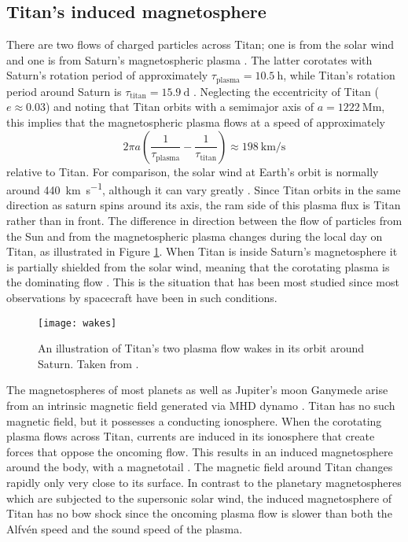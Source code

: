 \documentclass[12pt, parskip=full*, abstract]{scrartcl}
\begin{document}
\subsection{Titan's induced magnetosphere}\label{s:induced-magnetosphere}
There are two flows of charged particles across Titan; one is from the solar wind and one is from Saturn's magnetospheric plasma \parencite{ionosphere-magnetosphere-interaction-coates}. The latter corotates with Saturn's rotation period of approximately $\tau_\text{plasma}=\SI{10.5}{\hour}$, while Titan's rotation period around Saturn is $\tau_\text{titan}=\SI{15.9}{\day}$ \parencite{fundamental-planetary-science}. Neglecting the eccentricity of Titan ($e\approx0.03$) and noting that Titan orbits with a semimajor axis of $a=\SI{1222}{\mega\metre}$, this implies that the magnetospheric plasma flows at a speed of approximately
\begin{equation}
	2\pi a\left(\frac{1}{\tau_\text{plasma}} - \frac{1}{\tau_\text{titan}}\right)\approx\SI{198}{\kilo\metre\per\second}
\end{equation}
relative to Titan. For comparison, the solar wind at Earth's orbit is normally around \SI{440}{\kilo\metre\per\second}, although it can vary greatly \parencite{encyclopedia-solar-wind}. Since Titan orbits in the same direction as saturn spins around its axis, the ram side of this plasma flux is  Titan rather than in front. The difference in direction between the flow of particles from the Sun and from the magnetospheric plasma changes during the local day on Titan, as illustrated in Figure \ref{fig:wakes}. When Titan is inside Saturn's magnetosphere it is partially shielded from the solar wind, meaning that the corotating plasma is the dominating flow \parencite{ionosphere-magnetosphere-interaction-coates}. This is the situation that has been most studied since most observations by spacecraft have been in such conditions.

\begin{figure}[htbp]
	\centering
	\texttt{[image: wakes]}
	\caption{An illustration of Titan's two plasma flow wakes in its orbit around Saturn. Taken from \textcite{ionosphere-magnetosphere-interaction-coates}.}
	\label{fig:wakes}
\end{figure}

The magnetospheres of most planets as well as Jupiter's moon Ganymede arise from an intrinsic magnetic field generated via MHD dynamo \parencite{encyclopedia-magnetospheres}. Titan has no such magnetic field, but it possesses a conducting ionosphere. When the corotating plasma flows across Titan, currents are induced in its ionosphere that create forces that oppose the oncoming flow. This results in an induced magnetosphere around the body, with a magnetotail . The magnetic field around Titan changes rapidly only very close to its surface. In contrast to the planetary magnetospheres which are subjected to the supersonic solar wind, the induced magnetosphere of Titan has no bow shock since the oncoming plasma flow is slower than both the Alfvén speed and the sound speed of the plasma. 
\end{document}
